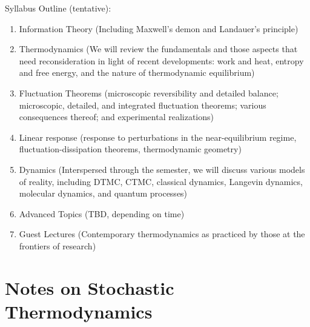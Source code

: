 \documentclass[article,notes]{bespoke6}
\begin{document}
Syllabus Outline (tentative):
\begin{enumerate}
  \item Information Theory (Including Maxwell's demon and Landauer's principle)
  \item Thermodynamics (We will review the fundamentals and those aspects that need reconsideration in light of recent developments: work and heat, entropy and free energy, and the nature of thermodynamic equilibrium) 
  \item Fluctuation Theorems (microscopic reversibility and detailed balance; microscopic, detailed, and integrated fluctuation theorems; various consequences thereof; and experimental realizations)
  \item Linear response (response to perturbations in the near-equilibrium regime, fluctuation-dissipation theorems, thermodynamic geometry)
  \item Dynamics (Interspersed through the semester, we will discuss various models of reality, including DTMC, CTMC, classical dynamics, Langevin dynamics, molecular dynamics, and quantum processes)
  \item Advanced Topics (TBD, depending on time)
  \item Guest Lectures (Contemporary thermodynamics as practiced by those at the frontiers of research)
\end{enumerate}

\newpage



\clearpage





\part{Notes on Stochastic Thermodynamics}


\appendix


%




\end{document}
